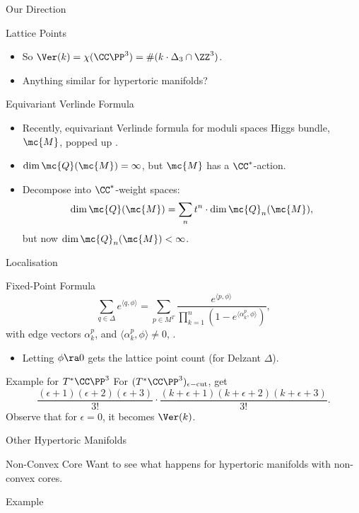 \begin{frame}{Our Direction}
    \begin{block}{Lattice Points}
    \begin{itemize}
        \item So $\Ver(k) = \chi(\CC\PP^{3}) = \#( k\cdot \Delta_{3} \cap \ZZ^{3} )$.
        \item Anything similar for hypertoric manifolds?
    \end{itemize}
    \end{block}
    \begin{block}{Equivariant Verlinde Formula}
        \begin{itemize}
            \item Recently, equivariant Verlinde formula for moduli spaces Higgs bundle, $\mc{M}$, popped up \cite{GP2017}.
            \item $\dim \mc{Q} (\mc{M}) = \infty$, but $\mc{M}$ has a $\CC^{\ast}$-action.
            \item Decompose into $\CC^{\ast}$-weight spaces:
            \vspace*{-6pt}
                $$ \dim \mc{Q} (\mc{M}) = \sum_{n} t^{n} \cdot \dim \mc{Q}_{n}(\mc{M}), $$
            \vspace*{-6pt}
            but now $\dim \mc{Q}_{n}(\mc{M}) < \infty$.
        \end{itemize}
    \end{block}
\end{frame}

\begin{frame}{Localisation}
    \begin{block}{Fixed-Point Formula}
        \vspace*{-12pt}
        $$ \sum_{q \in \Delta} e^{\langle q, \phi \rangle} = \sum_{p \in M^{T}} \frac{ e^{\langle p, \phi \rangle} }{ \prod_{k = 1}^{n} (1- e^{\langle \alpha_{k}^{p}, \phi \rangle}) }, $$
            with edge vectors $\alpha_{k}^{p}$, and $\langle \alpha_{k}^{p}, \phi \rangle \neq 0$, \cite{barvinok1993}.
        \begin{itemize}
            \item Letting $\phi \ra 0$ gets the lattice point count (for Delzant $\Delta$).
        \end{itemize}
    \end{block}
    \begin{block}{Example for $T^{\ast}\CC\PP^{3}$}
        For $(T^{\ast}\CC\PP^{3})_{\epsilon-\text{cut}}$, get
        $$ \frac{(\epsilon + 1)(\epsilon + 2)(\epsilon + 3)}{3!} \cdot \frac{(k + \epsilon +1)(k + \epsilon + 2)(k + \epsilon + 3)}{3!}. $$
        Observe that for $\epsilon = 0$, it becomes $\Ver(k)$.
    \end{block}   
\end{frame}

\begin{frame}{Other Hypertoric Manifolds}
    \begin{block}{Non-Convex Core}
        Want to see what happens for hypertoric manifolds with non-convex cores.
    \end{block}
    \begin{block}{Example}
        \vspace{136pt}
    \end{block}      
\end{frame}